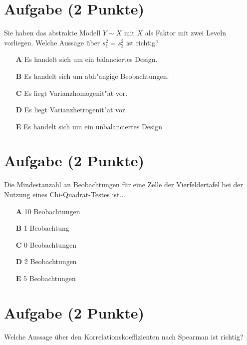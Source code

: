 \documentclass[a4paper, 10pt]{scrartcl}\usepackage[]{graphicx}\usepackage[]{xcolor}
\begin{document}
\section{Aufgabe \hfill (2 Punkte)}




Sie haben das abstrakte Modell $Y \sim X$ mit $X$ als Faktor mit zwei
Leveln vorliegen. Welche Aussage {\"u}ber $s^2_1 = s^2_2$ ist richtig?



\begin{enumerate}
\item [\textbf{A} \msquare] Es handelt sich um ein balanciertes Design.
\item [\textbf{B} \msquare] Es handelt sich um abh{"a}ngige Beobachtungen.
\item [\textbf{C} \msquare] Es liegt Varianzhomogenit{"a}t vor.
\item [\textbf{D} \msquare] Es liegt Varianzhetrogenit{"a}t vor.
\item [\textbf{E} \msquare] Es handelt sich um ein unbalanciertes Design
\end{enumerate} 

\section{Aufgabe \hfill (2 Punkte)}

Die Mindestanzahl an Beobachtungen f{\"u}r eine Zelle der Vierfeldertafel bei
der Nutzung eines Chi-Quadrat-Testes ist...



\begin{enumerate}
\item [\textbf{A} \msquare] 10 Beobachtungen
\item [\textbf{B} \msquare] 1 Beobachtung
\item [\textbf{C} \msquare] 0 Beobachtungen
\item [\textbf{D} \msquare] 2 Beobachtungen
\item [\textbf{E} \msquare] 5 Beobachtungen
\end{enumerate} 

\section{Aufgabe \hfill (2 Punkte)}




Welche Aussage {\"u}ber den Korrelationskoeffizienten nach Spearman
ist richtig?
\end{document}
